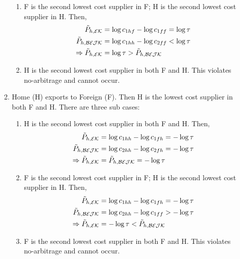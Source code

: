 \documentclass[12pt,dvips, ps2pdf]{article}
\begin{document}
\begin{appendix}
\begin{enumerate}
\begin{enumerate}
\begin{enumerate}
\item F is the second lowest cost supplier in F; H is the second lowest cost supplier in H. Then,
\begin{align}
\tilde P_{h, \mathcal{EK}}&=\log c_{1hf}-\log c_{1ff}=\log\tau\notag\\
\tilde P_{h, \mathcal{BEJK}}&=\log c_{1hh}-\log c_{2ff}<\log\tau\notag\\
\Rightarrow \tilde P_{h, \mathcal{EK}}&=\log\tau>\tilde P_{h, \mathcal{BEJK}}\notag
\end{align}

\item H is the second lowest cost supplier in both F and H. This violates no-arbitrage and cannot occur.

\end{enumerate}

\item Home (H) exports to Foreign (F). Then H is the lowest cost supplier in both F and H. There are three sub cases:

\begin{enumerate}
\item H is the second lowest cost supplier in both F and H. Then,
\begin{align}
\tilde P_{h, \mathcal{EK}}&=\log c_{1hh}-\log c_{1fh}=-\log\tau\notag\\
\tilde P_{h, \mathcal{BEJK}}&=\log c_{2hh}-\log c_{2fh}=-\log\tau\notag\\
\Rightarrow \tilde P_{h, \mathcal{EK}}&=\tilde P_{h, \mathcal{BEJK}}=-\log\tau\notag
\end{align}

\item F is the second lowest cost supplier in F; H is the second lowest cost supplier in H. Then,
\begin{align}
\tilde P_{h, \mathcal{EK}}&=\log c_{1hh}-\log c_{1fh}=-\log\tau\notag\\
\tilde P_{h, \mathcal{BEJK}}&=\log c_{2hh}-\log c_{1ff}>-\log\tau\notag\\
\Rightarrow \tilde P_{h, \mathcal{EK}}&=-\log\tau<\tilde P_{h, \mathcal{BEJK}}\notag
\end{align}

\item F is the second lowest cost supplier in both F and H. This violates no-arbitrage and cannot occur.

\end{enumerate}


\end{enumerate}
\end{enumerate}
\end{appendix}
\end{document}
